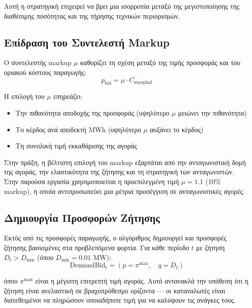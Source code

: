 Αυτή η στρατηγική επιχειρεί να βρει μια ισορροπία μεταξύ της μεγιστοποίησης της διαθέσιμης ποσότητας και της τήρησης τεχνικών περιορισμών.

\subsection{Επίδραση του Συντελεστή Markup}
\label{subsec:markup-factor}

Ο συντελεστής markup $\mu$ καθορίζει τη σχέση μεταξύ της τιμής προσφοράς και του οριακού κόστους παραγωγής:
\begin{equation}
\label{eq:markup-definition}
p_{\text{bid}} = \mu \cdot C_{\text{marginal}}
\end{equation}

Η επιλογή του $\mu$ επηρεάζει:
\begin{itemize}
    \item Την πιθανότητα αποδοχής της προσφοράς (υψηλότερο $\mu$ μειώνει την πιθανότητα)
    \item Το κέρδος ανά αποδεκτή MWh (υψηλότερο $\mu$ αυξάνει το κέρδος)
    \item Τη συνολική τιμή εκκαθάρισης της αγοράς
\end{itemize}

Στην πράξη, η βέλτιστη επιλογή του markup εξαρτάται από την ανταγωνιστική δομή της αγοράς, την ελαστικότητα της ζήτησης και τη στρατηγική των ανταγωνιστών. Στην παρούσα εργασία χρησιμοποιείται η προεπιλεγμένη τιμή $\mu = 1.1$ (10\% markup), η οποία αντιπροσωπεύει μια μέτρια προσέγγιση σε ανταγωνιστικές αγορές.

\subsection{Δημιουργία Προσφορών Ζήτησης}
\label{subsec:demand-orders}

Εκτός από τις προσφορές παραγωγής, ο αλγόριθμος δημιουργεί και προσφορές ζήτησης βασισμένες στα προβλεπόμενα φορτία. Για κάθε περίοδο $t$ με ζήτηση $D_t > D_{\min}$ (όπου $D_{\min} = 0.01$ MW):
\begin{equation}
\label{eq:demand-order}
\text{DemandBid}_t = \left( p = \pi^{\max}, \quad q = D_t \right)
\end{equation}

όπου $\pi^{\max}$ είναι η μέγιστη επιτρεπτή τιμή αγοράς. Αυτό αντανακλά την υπόθεση ότι η ζήτηση είναι ανελαστική σε βραχυπρόθεσμο ορίζοντα --- οι καταναλωτές είναι διατεθειμένοι να πληρώσουν οποιαδήποτε τιμή για να καλύψουν τις ανάγκες τους.

